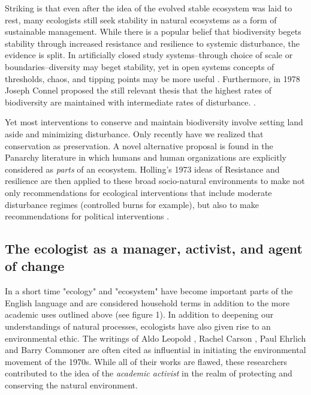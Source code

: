 Striking is that even after the idea of the evolved stable ecosystem was laid to rest, many ecologists still seek stability in natural ecosystems as a form of sustainable management. While there is a popular belief that biodiversity begets stability through increased resistance and resilience to systemic disturbance, the evidence is split. In artificially closed study systems--through choice of scale or boundaries--diversity may beget stability, yet in open systems concepts of thresholds, chaos, and tipping points may be more useful \citep[for opposing arguments see][]{tilman_1994,goodman_1975}. Furthermore, in 1978 Joseph Connel proposed the still relevant thesis that the highest rates of biodiversity are maintained with intermediate rates of disturbance. \citep{connel_1978}. 

Yet most interventions to conserve and maintain biodiversity involve setting land aside and minimizing disturbance. Only recently have we realized that conservation as preservation. A novel alternative proposal is found in the Panarchy literature in which humans and human organizations are explicitly considered as \textit{parts} of an ecosystem. Holling's 1973 ideas of Resistance and resilience are then applied to these broad socio-natural environments to make not only recommendations for ecological interventions that include moderate disturbance regimes (controlled burns for example), but also to make recommendations for political interventions \citep{holling_2002}.

\subsection{The ecologist as a manager, activist, and agent of change}

In a short time "ecology" and "ecosystem" have become important parts of the English language and are considered household terms in addition to the more academic uses outlined above (see figure 1). In addition to deepening our understandings of natural processes, ecologists have also given rise to an environmental ethic. The writings of Aldo Leopold \citep{leopold_1949}, Rachel Carson \citep{carson_1962}, Paul Ehrlich \citep{ehrlich_1968} and Barry Commoner \citep{commoner_1971} are often cited as influential in initiating the environmental movement of the 1970s. While all of their works are flawed, these researchers contributed to the idea of the \textit{academic activist} in the realm of protecting and conserving the natural environment. 
 
